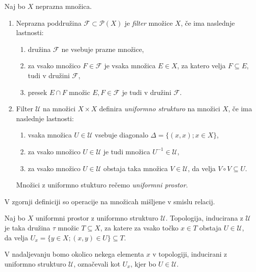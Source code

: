 \documentclass[mat1]{fmfdelo}
\begin{document}
\begin{definicija}\label{def:uniform}
	Naj bo $X$ neprazna množica.
	\begin{enumerate}
		\item Neprazna poddružina $\mathcal{F} \subset \mathcal{P}(X)$ je \emph{filter} množice $X$, če ima naslednje lastnosti:
		\begin{enumerate}
			\item družina $\mathcal{F}$ ne vsebuje prazne množice,
			\item za vsako množico $F \in \mathcal{F}$ je vsaka množica $E \in X$, za katero velja $F \subseteq E$, tudi v družini $\mathcal{F}$,
			\item presek $E \cap F$ množic $E, F \in \mathcal{F}$ je tudi v družini $\mathcal{F}$.
		\end{enumerate}
		\item Filter $\mathcal{U}$ na množici $X \times X$ definira \emph{uniformno strukturo} na množici $X$, če ima naslednje lastnosti:
		\begin{enumerate}
			\item vsaka množica $U \in \mathcal{U}$ vsebuje diagonalo $\Delta = \lbrace (x, x) ; x \in X \rbrace$,
			\item za vsako množico $U \in \mathcal{U}$ je tudi množica $U^{-1} \in \mathcal{U}$,
			\item za vsako množico $U \in \mathcal{U}$ obstaja taka množica $V \in \mathcal{U}$, da velja $V \circ V \subseteq U$.
		\end{enumerate}
		Množici z uniformno stukturo rečemo \emph{uniformni prostor}.
	\end{enumerate}
\end{definicija}

\begin{opomba}
	V zgornji definiciji so operacije na množicah mišljene v smislu relacij.
\end{opomba}

\begin{definicija}\label{def:uniinduciranatopo}
	Naj bo $X$ uniformni prostor z uniformno strukturo $\mathcal{U}$. Topologija, inducirana z $\mathcal{U}$ je taka družina $\tau$ množic $T \subseteq X$, za katere za vsako točko $x \in T$ obstaja $U \in \mathcal{U}$, da velja $U_x = \lbrace y \in X ; (x, y) \in U \rbrace \subseteq T$.
\end{definicija}

\begin{opomba}
	V nadaljevanju bomo okolico nekega elementa $x$ v topologiji, in\-du\-ci\-ra\-ni z uniformno strukturo $\mathcal{U}$, označevali kot $U_x$, kjer bo $U \in \mathcal{U}$.
\end{opomba}
\end{document}
